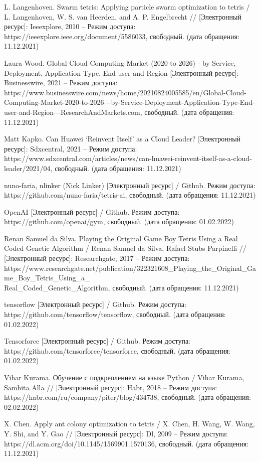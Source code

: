 \documentclass{article}
\begin{document}
\begin{center}
\begin{thebibliography}{}
 L. Langenhoven. Swarm tetris: Applying particle swarm optimization to tetris / L. Langenhoven, W. S. van Heerden, and A. P. Engelbrecht // [Электронный ресурс]: Ieeexplore, 2010 – Режим доступа: https://ieeexplore.ieee.org/document/5586033, свободный. (дата обращения: 11.12.2021)

 Laura Wood. Global Cloud Computing Market (2020 to 2026) - by Service, Deployment, Application Type, End-user and Region [Электронный ресурс]: Businesswire, 2021 – Режим доступа: https://www.businesswire.com/news/home/20210824005585/en/Global-Cloud-Computing-Market-2020-to-2026---by-Service-Deployment-Application-Type-End-user-and-Region---ResearchAndMarkets.com, свободный. (дата обращения: 11.12.2021)

 Matt Kapko. Can Huawei ‘Reinvent Itself’ as a Cloud Leader? [Электронный ресурс]: Sdxcentral, 2021 – Режим доступа: https://www.sdxcentral.com/articles/news/can-huawei-reinvent-itself-as-a-cloud-leader/2021/04, свободный. (дата обращения: 11.12.2021)

 nuno-faria, nlinker (Nick Linker) [Электронный ресурс] / Github. Режим доступа: https://github.com/nuno-faria/tetris-ai, свободный. (дата обращения: 11.12.2021)

 OpenAI [Электронный ресурс] / Github. Режим доступа: https://github.com/openai/gym, свободный. (дата обращения: 01.02.2022)

 Renan Samuel da Silva. Playing the Original Game Boy Tetris Using a Real Coded Genetic Algorithm / Renan Samuel da Silva, Rafael Stubs Parpinelli // [Электронный ресурс]: Researchgate, 2017 – Режим доступа: https://www.researchgate.net/publication/322321608\_Playing\_the\_Original\_Game\_Boy\_Tetris\_Using\_a\_\\Real\_Coded\_Genetic\_Algorithm, свободный. (дата обращения: 11.12.2021)

 tensorflow [Электронный ресурс] / Github. Режим доступа: https://github.com/tensorflow/tensorflow, свободный. (дата обращения: 01.02.2022)

 Tensorforce [Электронный ресурс] / Github. Режим доступа: https://github.com/tensorforce/tensorforce, свободный. (дата обращения: 01.02.2022)

 Vihar Kurama. Обучение с подкреплением на языке Python / Vihar Kurama, Samhita Alla // [Электронный ресурс]: Habr, 2018 – Режим доступа: https://habr.com/ru/company/piter/blog/434738, свободный. (дата обращения: 02.02.2022)

 X. Chen. Apply ant colony optimization to tetris / X. Chen, H. Wang, W. Wang, Y. Shi, and Y. Gao // [Электронный ресурс]: Dl, 2009 – Режим доступа: https://dl.acm.org/doi/10.1145/1569901.1570136, свободный. (дата обращения: 11.12.2021)

\end{thebibliography}
\end{center}
\end{document}

